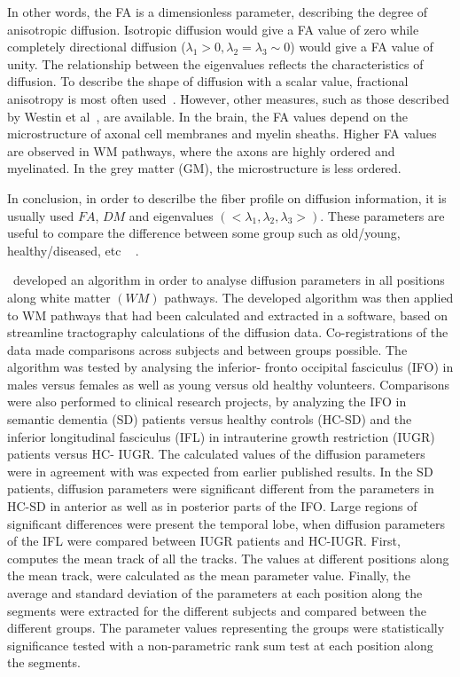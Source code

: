 In other words, the FA is a dimensionless parameter, describing the degree of anisotropic diffusion. Isotropic diffusion would give a FA value of zero while completely directional diffusion ($\lambda_{1} > 0, \lambda_{2} = \lambda_{3} \sim 0$) would give a FA value of unity. 
The relationship between the eigenvalues reflects the characteristics of diffusion. To describe the shape of diffusion with a scalar value, fractional anisotropy is most often used~\cite{bihan2001tensor}. However, other measures, such as those described by Westin et al~\cite{westin2002processing}, are available. In the brain, the FA values depend on the microstructure of axonal cell membranes and myelin sheaths. Higher FA values are observed in WM pathways, where the axons are highly ordered and myelinated. In the grey matter (GM), the microstructure is less ordered.

In conclusion, in order to descrilbe the fiber profile on diffusion information, it is usually used $FA$, $DM$ and eigenvalues $(<\lambda_{1},\lambda_{2},\lambda_{3}>)$. These parameters are useful to compare the difference between some group such as old/young, healthy/diseased, etc ~\cite{johanna2011improved} \cite{clayden2008comparative}. 

~\cite{johanna2011improved}developed an algorithm in order to analyse diffusion parameters in all
positions along white matter $(WM)$ pathways. The developed algorithm was then applied to WM pathways
that had been calculated and extracted in a software, based on streamline tractography
calculations of the diffusion data. Co-registrations of the data made comparisons across
subjects and between groups possible. The algorithm was tested by analysing the inferior-
fronto occipital fasciculus (IFO) in males versus females as well as young versus old healthy
volunteers. Comparisons were also performed to clinical research projects, by analyzing the
IFO in semantic dementia (SD) patients versus healthy controls (HC-SD) and the inferior
longitudinal fasciculus (IFL) in intrauterine growth restriction (IUGR) patients versus HC-
IUGR. The calculated values of the diffusion parameters were in agreement with was expected from
earlier published results. In the SD patients, diffusion parameters were significant different
from the parameters in HC-SD in anterior as well as in posterior parts of the IFO. Large
regions of significant differences were present the temporal lobe, when diffusion parameters
of the IFL were compared between IUGR patients and HC-IUGR. First, ~\cite{johanna2011improved} computes the mean track of all the tracks. The values at different positions along the mean track, were calculated as the mean parameter value. Finally, the average and standard deviation of the parameters at each position along the segments were extracted for the different subjects and compared between the different groups. The parameter values representing the groups were statistically significance tested with a non-parametric rank sum test at each position
along the segments.

